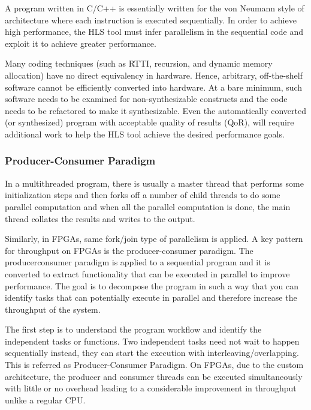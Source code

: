 \par A program written in C/C++ is essentially written for the von Neumann style of architecture where each instruction is executed sequentially. In order to achieve high performance, the HLS tool must infer parallelism in the sequential code and exploit it to achieve
greater performance. 

\par Many coding techniques (such as RTTI, recursion,
and dynamic memory allocation) have no direct equivalency in hardware. Hence, arbitrary, off-the-shelf software cannot be efficiently converted into hardware. At a bare minimum, such software needs
to be examined for non-synthesizable constructs and the code needs to be refactored to make it synthesizable. Even the automatically converted (or synthesized) program with acceptable quality of results (QoR), will require additional work to help the HLS tool achieve the desired performance goals. 

\subsubsection{Producer-Consumer Paradigm}
In a multithreaded program, there is usually a master
thread that performs some initialization steps and then forks off a number of child threads to do some parallel computation and when all the parallel computation is done, the main thread
collates the results and writes to the output. 

\par Similarly, in FPGAs, same fork/join type of parallelism is applied.
A key pattern for throughput on FPGAs is the producer-consumer paradigm. The producerconsumer
paradigm is applied to a sequential program and it is converted to extract functionality that can be executed in parallel to improve performance. The goal is to decompose the program in such a way
that you can identify tasks that can potentially execute in parallel and therefore increase the throughput of the system.

\par The first step is to understand the program workflow and identify the independent tasks or functions. Two independent tasks need not wait to happen sequentially instead, they can start the execution with interleaving/overlapping. This is referred as Producer-Consumer Paradigm. On FPGAs, due to the custom architecture, the producer and consumer threads can be executed simultaneously with little or no overhead leading to a considerable improvement in throughput unlike a regular CPU. 

